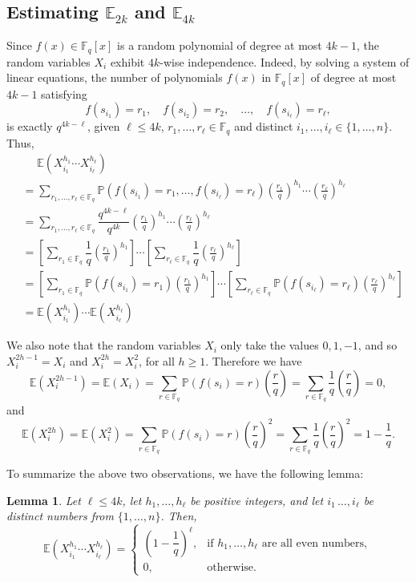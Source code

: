 \documentclass{amsart}
\theoremstyle{plain}
\newtheorem{lemma}[theorem]{Lemma}
\theoremstyle{definition}
\newcommand{\legendre}[2]{\genfrac{(}{)}{}{}{#1}{#2}}
\newcommand{\EE}{\mathbb{E}}
\newcommand{\PP}{\mathbb{P}}
\newcommand{\Fq}{\mathbb{F}_q}
\begin{document}
\subsection{Estimating $\EE_{2k}$ and $\EE_{4k}$}
Since $f(x)\in\Fq[x]$ is a random polynomial of degree at most $4k-1$, the random variables $X_i$ exhibit $4k$-wise independence. Indeed, by solving a system of linear equations, the number of polynomials $f(x)$ in $\Fq[x]$ of degree at most $4k-1$ satisfying
\[
f(s_{i_1})=r_1,\quad f(s_{i_2})=r_2,\quad\ldots,\quad f(s_{i_\ell})=r_\ell,
\]
is exactly $q^{4k-\ell}$, given $\ell\leq4k$, $r_1,\ldots,r_\ell\in\Fq$ and distinct $i_1,\ldots,i_\ell\in\{1,\ldots,n\}$. Thus,
\[
\begin{split}
&\quad\,\,\EE(X_{i_1}^{h_1}\cdots{X_{i_\ell}^{h_{\ell}}})\\
&=\sum_{r_1,\ldots,r_\ell\in\Fq}\PP(f(s_{i_1})=r_1,\ldots,f(s_{i_\ell})=r_\ell)\legendre{r_1}{q}^{h_1}\cdots\legendre{r_\ell}{q}^{h_\ell}\\
&=\sum_{r_1,\ldots,r_\ell\in\Fq}\dfrac{q^{4k-\ell}}{q^{4k}}\legendre{r_1}{q}^{h_1}\cdots\legendre{r_\ell}{q}^{h_\ell}\\
&=\left[\sum_{r_1\in\Fq}\dfrac{1}{q}\legendre{r_1}{q}^{h_1}\right]\cdots\left[\sum_{r_\ell\in\Fq}\dfrac{1}{q}\legendre{r_\ell}{q}^{h_\ell}\right]\\
&=\left[\sum_{r_1\in\Fq}\PP(f(s_{i_1})=r_1)\legendre{r_1}{q}^{h_1}\right]\cdots\left[\sum_{r_\ell\in\Fq}\PP(f(s_{i_\ell})=r_\ell)\legendre{r_\ell}{q}^{h_\ell}\right]\\
&=\EE(X_{i_1}^{h_1})\cdots\EE(X_{i_\ell}^{h_\ell})
\end{split}
\]

We also note that the random variables $X_i$ only take the values $0,1,-1$, and so $X_i^{2h-1}=X_i$ and $X_i^{2h}=X_i^2$, for all $h\geq1$. Therefore we have
\[
\EE(X_i^{2h-1})=\EE(X_i)=\sum_{r\in\Fq}\PP(f(s_i)=r)\legendre{r}{q}=\sum_{r\in\Fq}\dfrac{1}{q}\legendre{r}{q}=0,
\]
and
\[
\EE(X_i^{2h})=\EE(X_i^2)=\sum_{r\in\Fq}\PP(f(s_i)=r)\legendre{r}{q}^2=\sum_{r\in\Fq}\dfrac{1}{q}\legendre{r}{q}^2=1-\dfrac{1}{q}.
\]

To summarize the above two observations, we have the following lemma:
\begin{lemma}
\label{lem:expectationOddEven}
Let $\ell\leq4k$, let $h_1,\ldots,h_\ell$ be positive integers, and let $i_1\,\ldots,i_\ell$ be distinct numbers from $\{1,\ldots,n\}$. Then,
\[
\EE(X_{i_1}^{h_1}\cdots{X_{i_\ell}^{h_{\ell}}})=
\begin{cases}
\left(1-\dfrac{1}{q}\right)^\ell,&\mbox{if $h_1,\ldots,h_\ell$ are all even numbers},\\
0,&\text{otherwise.}
\end{cases}
\]
\end{lemma}
\end{document}
